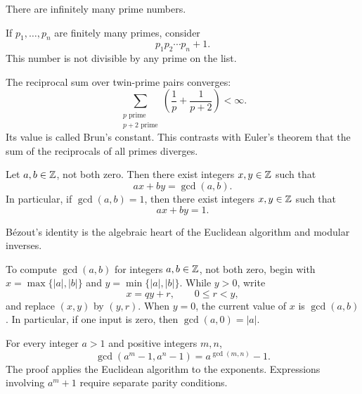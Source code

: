     \begin{theorem}
        There are infinitely many prime numbers.
    \end{theorem}

    \begin{idea}
        If $p_1,\dots,p_n$ are finitely many primes, consider
        \[
            p_1p_2\cdots p_n+1.
        \]
        This number is not divisible by any prime on the list.
    \end{idea}

    \begin{theorem}
        The reciprocal sum over twin-prime pairs converges:
        \[
            \sum_{\substack{p\text{ prime}\\p+2\text{ prime}}}
            \left(\frac{1}{p}+\frac{1}{p+2}\right)
            <\infty.
        \]
        Its value is called Brun's constant. This contrasts with Euler's
        theorem that the sum of the reciprocals of all primes diverges.
    \end{theorem}

    \begin{theorem}
        Let $a,b\in\mathbb{Z}$, not both zero. Then there exist integers $x,y\in\mathbb{Z}$
        such that
        \[
            ax+by=\gcd(a,b).
        \]
        In particular, if $\gcd(a,b)=1$, then there exist integers $x,y\in\mathbb{Z}$
        such that
        \[
            ax+by=1.
        \]
    \end{theorem}

    \begin{remark}
        B\'ezout's identity is the algebraic heart of the Euclidean algorithm and
        modular inverses.
    \end{remark}

    \begin{algorithm}
        To compute $\gcd(a,b)$ for integers $a,b\in\mathbb{Z}$, not both zero, begin
        with $x=\max\{|a|,|b|\}$ and $y=\min\{|a|,|b|\}$. While $y>0$, write
        \[
            x=qy+r,
            \qquad 0\leq r<y,
        \]
        and replace $(x,y)$ by $(y,r)$. When $y=0$, the current value of $x$
        is $\gcd(a,b)$. In particular, if one input is zero, then
        $\gcd(a,0)=|a|$.
    \end{algorithm}

    \begin{theorem}
        For every integer $a>1$ and positive integers $m,n$,
        \[
            \gcd(a^m-1,a^n-1)=a^{\gcd(m,n)}-1.
        \]
        The proof applies the Euclidean algorithm to the exponents.
        Expressions involving $a^m+1$ require separate parity conditions.
    \end{theorem}

